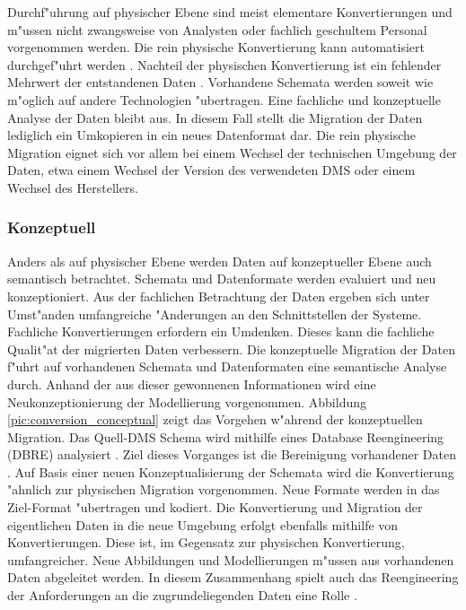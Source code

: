 Durchf"uhrung auf physischer Ebene sind meist elementare Konvertierungen und m"ussen nicht zwangsweise von Analysten oder fachlich geschultem Personal vorgenommen werden. Die rein physische Konvertierung kann automatisiert durchgef"uhrt werden \citep{abiteboul-1999}.
\lb
Nachteil der physischen Konvertierung ist ein fehlender Mehrwert der entstandenen Daten \citep{henrard-2002}. Vorhandene Schemata werden soweit wie m"oglich auf andere Technologien "ubertragen. Eine fachliche und konzeptuelle Analyse der Daten bleibt aus. In diesem Fall stellt die Migration der Daten lediglich ein Umkopieren in ein neues Datenformat dar.
\lb
Die rein physische Migration eignet sich vor allem bei einem Wechsel der technischen Umgebung der Daten, etwa einem Wechsel der Version des verwendeten DMS oder einem Wechsel des Herstellers.

\subsubsection{Konzeptuell}

Anders als auf physischer Ebene werden Daten auf konzeptueller Ebene auch semantisch betrachtet. Schemata und Datenformate werden evaluiert und neu konzeptioniert. Aus der fachlichen Betrachtung der Daten ergeben sich unter Umst"anden umfangreiche "Anderungen an den Schnittstellen der Systeme. Fachliche Konvertierungen erfordern ein Umdenken. Dieses kann die fachliche Qualit"at der migrierten Daten verbessern.
\lb
Die konzeptuelle Migration der Daten f"uhrt auf vorhandenen Schemata und Datenformaten eine semantische Analyse durch. Anhand der aus dieser gewonnenen Informationen wird eine Neukonzeptionierung der Modellierung vorgenommen. Abbildung \ref{pic:conversion_conceptual} zeigt das Vorgehen w"ahrend der konzeptuellen Migration. Das Quell-DMS Schema wird mithilfe eines Database Reengineering (DBRE) analysiert \citep{henrard-2002}. Ziel dieses Vorganges ist die Bereinigung vorhandener Daten \citep{rahm-2010} \citep{hernandez-1998}. Auf Basis einer neuen Konzeptualisierung der Schemata wird die Konvertierung "ahnlich zur physischen Migration vorgenommen. Neue Formate werden in das Ziel-Format "ubertragen und kodiert. Die Konvertierung und Migration der eigentlichen Daten in die neue Umgebung erfolgt ebenfalls mithilfe von Konvertierungen. Diese ist, im Gegensatz zur physischen Konvertierung, umfangreicher. Neue Abbildungen und Modellierungen m"ussen aus vorhandenen Daten abgeleitet werden. In diesem Zusammenhang spielt auch das Reengineering der Anforderungen an die zugrundeliegenden Daten eine Rolle \citep{aiken-1994}.

